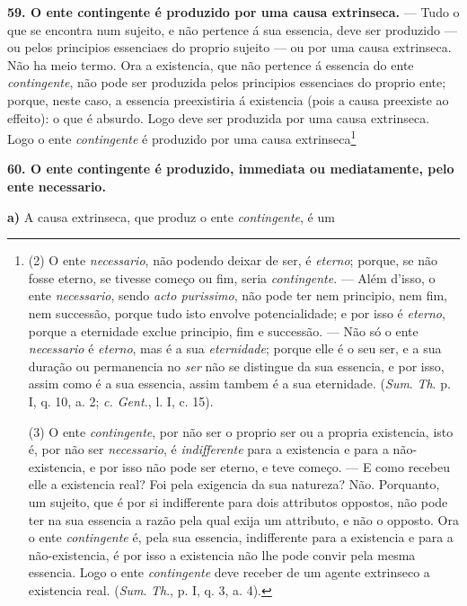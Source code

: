 \textbf{59. O ente contingente é produzido por uma causa extrinseca.} — Tudo o que se encontra num sujeito, e não pertence á sua essencia, deve ser produzido — ou pelos principios essenciaes do proprio sujeito — ou por uma causa extrinseca. Não ha meio termo. Ora a existencia, que não pertence á essencia do ente \emph{contingente}, não pode ser produzida pelos principios essenciaes do proprio ente; porque, neste caso, a essencia preexistiria á existencia (pois a causa preexiste ao effeito): o que é absurdo. Logo deve ser produzida por uma causa extrinseca. Logo o ente \emph{contingente} é produzido por uma causa extrinseca\footnote{(2) O ente \emph{necessario}, não podendo deixar de ser, é \emph{eterno}; porque, se não fosse eterno, se tivesse começo ou fim, seria \emph{contingente}. — Além d'isso, o ente \emph{necessario}, sendo \emph{acto purissimo}, não pode ter nem principio, nem fim, nem successão, porque tudo isto envolve potencialidade; e por isso é \emph{eterno}, porque a eternidade exclue principio, fim e successão. — Não só o ente \emph{necessario} é \emph{eterno}, mas é a sua \emph{eternidade}; porque elle é o seu ser, e a sua duração ou permanencia no \emph{ser} não se distingue da sua essencia, e por isso, assim como é a sua essencia, assim tambem é a sua eternidade. (\emph{Sum}. \emph{Th}. p. I, q. 10, a. 2; \emph{c. Gent.}, l. I, c. 15).\par (3) O ente \emph{contingente}, por não ser o proprio ser ou a propria existencia, isto é, por não ser \emph{necessario}, é \emph{indifferente} para a existencia e para a não-existencia, e por isso não pode ser eterno, e teve começo. — E como recebeu elle a existencia real? Foi pela exigencia da sua natureza? Não. Porquanto, um sujeito, que é por si indifferente para dois attributos oppostos, não pode ter na sua essencia a razão pela qual exija um attributo, e não o opposto. Ora o ente \emph{contingente} é, pela sua essencia, indifferente para a existencia e para a não-existencia, é por isso a existencia não lhe pode convir pela mesma essencia. Logo o ente \emph{contingente} deve receber de um agente extrinseco a existencia real. (\emph{Sum}. \emph{Th}., p. I, q. 3, a. 4).}

\textbf{60. O ente contingente é produzido, immediata ou mediatamente, pelo ente necessario.}

\textbf{a)} A causa extrinseca, que produz o ente \emph{contingente}, é um

